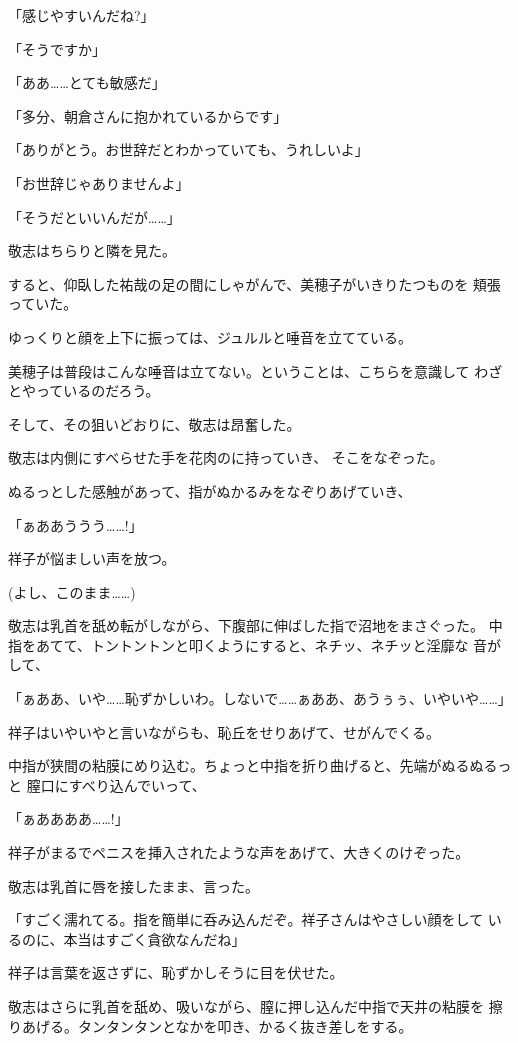 ﻿\documentclass[
    book,tate,
    line_length=30zw,
    jafontsize=12pt,
    paper=b5j,
    landscape,
    ]{jlreq}
\begin{document}
「感じやすいんだね?」

「そうですか」

「ああ……とても敏感だ」

「多分、朝倉さんに抱かれているからです」

「ありがとう。お世辞だとわかっていても、うれしいよ」

「お世辞じゃありませんよ」

「そうだといいんだが……」

敬志はちらりと隣を見た。

すると、仰臥した祐哉の足の間にしゃがんで、美穂子がいきりたつものを
頬張っていた。

ゆっくりと顔を上下に振っては、ジュルルと唾音を立てている。

美穂子は普段はこんな唾音は立てない。ということは、こちらを意識して
わざとやっているのだろう。

そして、その狙いどおりに、敬志は昂奮した。

敬志は内側にすべらせた手を花肉のに持っていき、
そこをなぞった。

ぬるっとした感触があって、指がぬかるみをなぞりあげていき、

「ぁああううう……!」

祥子が悩ましい声を放つ。

(よし、このまま……)

敬志は乳首を舐め転がしながら、下腹部に伸ばした指で沼地をまさぐった。
中指をあてて、トントントンと叩くようにすると、ネチッ、ネチッと淫靡な
音がして、

「ぁああ、いや……恥ずかしいわ。しないで……ぁああ、あうぅぅ、いやいや……」

祥子はいやいやと言いながらも、恥丘をせりあげて、せがんでくる。

中指が狭間の粘膜にめり込む。ちょっと中指を折り曲げると、先端がぬるぬるっと
膣口にすべり込んでいって、 

「ぁああああ……!」

祥子がまるでペニスを挿入されたような声をあげて、大きくのけぞった。

敬志は乳首に唇を接したまま、言った。

「すごく濡れてる。指を簡単に呑み込んだぞ。祥子さんはやさしい顔をして
いるのに、本当はすごく貪欲なんだね」

祥子は言葉を返さずに、恥ずかしそうに目を伏せた。

敬志はさらに乳首を舐め、吸いながら、膣に押し込んだ中指で天井の粘膜を
擦りあげる。タンタンタンとなかを叩き、かるく抜き差しをする。
\end{document}
